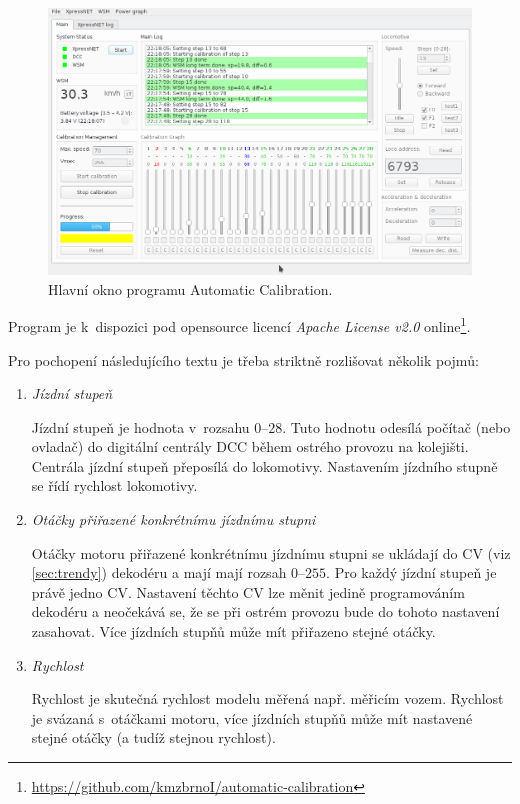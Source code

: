 \begin{figure}[ht]
\includegraphics[width=\textwidth]{data/ac_progress.png}
\caption{Hlavní okno programu Automatic Calibration.}
\label{fig:ac-gui}
\end{figure}

Program je k~dispozici pod opensource licencí \textit{Apache License v2.0}
online\footnote{\url{https://github.com/kmzbrnoI/automatic-calibration}}.

Pro pochopení následujícího textu je třeba striktně rozlišovat několik pojmů:

\begin{enumerate}
\item \textit{Jízdní stupeň}

Jízdní stupeň je hodnota v~rozsahu $0$--$28$. Tuto hodnotu odesílá počítač
(nebo ovladač) do digitální centrály \gls{DCC} během ostrého provozu na kolejišti.
Centrála jízdní stupeň přeposílá do lokomotivy. Nastavením jízdního stupně
se řídí rychlost lokomotivy.

\item \textit{Otáčky přiřazené konkrétnímu jízdnímu stupni}

Otáčky motoru přiřazené konkrétnímu jízdnímu stupni se ukládají do \gls{CV} (viz
\ref{sec:trendy}) dekodéru a mají mají rozsah $0$--$255$. Pro každý jízdní
stupeň je právě jedno \gls{CV}. Nastavení těchto \gls{CV} lze měnit jedině programováním
dekodéru a neočekává se, že se při ostrém provozu bude do tohoto nastavení
zasahovat. Více jízdních stupňů může mít přiřazeno stejné otáčky.

\item \textit{Rychlost}

Rychlost je skutečná rychlost modelu měřená např. měřicím vozem. Rychlost
je svázaná s~otáčkami motoru, více jízdních stupňů může mít nastavené
stejné otáčky (a tudíž stejnou rychlost).

\end{enumerate}

